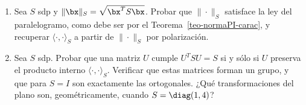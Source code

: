 \begin{enumerate}
\begin{enumerate}
\item \textbf{Caso normalizado.} Sean
$A=\big(\sum_i|x_i|^p\big)^{1/p}$ y $B=\big(\sum_i|y_i|^q\big)^{1/q}$.
Mostrar que si $A=0$ o $B=0$ la desigualdad es trivial. En caso contrario,
definir $u_i=|x_i|/A$ y $v_i=|y_i|/B$ y verificar que
$\sum_iu_i^p=\sum_iv_i^q=1$.

\item \textbf{Aplicación de Young.} Aplicar el ítem 1 con $a=u_i$, $b=v_i$,
sumar en $i$ y usar las normalizaciones del ítem 2.

\item \textbf{Conclusión.} Escribir $u_iv_i=|x_i||y_i|/(AB)$ y deducir
Hölder. Observar que $p=q=2$ es Cauchy-Schwarz.

\item \textbf{Caso extremo.} Demostrar Hölder para $p=1$, $q=\infty$, donde
$\|\by\|_\infty=\max_i|y_i|$.

\item \textbf{Minkowski.} Deducir de Hölder que
$\|\bx+\by\|_p\le\|\bx\|_p+\|\by\|_p$, es decir, que $\|\cdot\|_p$ es una
norma. \emph{Sugerencia:} escribir
$\sum_i|x_i+y_i|^p\le\sum_i|x_i|\,|x_i+y_i|^{p-1}
+\sum_i|y_i|\,|x_i+y_i|^{p-1}$ y aplicar Hölder a cada sumando.
\end{enumerate}

\item Sea $S$ sdp y $\|\bx\|_S=\sqrt{\bx^TS\bx}$. Probar que $\|\cdot\|_S$
satisface la ley del paralelogramo, como debe ser por el
Teorema~\ref{teo-normaPI-carac}, y recuperar $\langle\cdot,\cdot\rangle_S$ a
partir de $\|\cdot\|_S$ por polarización.

\item Sea $S$ sdp. Probar que una matriz $U$ cumple $U^TSU=S$ si y sólo si
$U$ preserva el producto interno $\langle\cdot,\cdot\rangle_S$. Verificar que
estas matrices forman un grupo, y que para $S=I$ son exactamente las
ortogonales. ¿Qué transformaciones del plano son, geométricamente, cuando
$S=\diag(1,4)$?

\end{enumerate}
